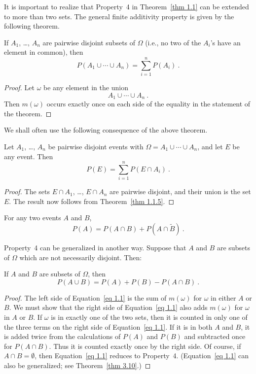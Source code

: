\par
It is important to realize that Property~4 in Theorem~\ref{thm 1.1} 
can be extended to more than two sets.  The general finite additivity
property is given by the following
theorem.\hfil\break
\begin{theorem}\label{thm 1.1.5}
\leanok
If $A_1$, \dots, $A_n$ are pairwise disjoint subsets of $\Omega$
(i.e., no two of the $A_i$'s have an element in common), then
$$
P(A_1 \cup \cdots \cup A_n) = \sum_{i = 1}^n P(A_i)\ .
$$
\end{theorem} 
\begin{proof}
\leanok
	Let $\omega$ be any element in the union
	$$A_1 \cup \cdots \cup A_n\ .$$
	Then $m(\omega)$ occurs exactly once on each side of the equality in the
	statement of the theorem.
\end{proof}
\par
We shall often use the following consequence of the above theorem.
\begin{theorem}\label{thm 1.2}
\leanok
 Let $A_1$, \dots, $A_n$ be pairwise disjoint events with $\Omega = A_1
\cup \cdots \cup A_n$, and let $E$ be any event.  Then
$$
P(E) = \sum_{i = 1}^n P(E \cap A_i)\ .
$$
\end{theorem}
\begin{proof}
\leanok
{}
	The sets $E \cap A_1$, \dots, $E \cap A_n$ are pairwise disjoint, and their 
	union is the set $E$.  The result now follows from Theorem~\ref{thm 1.1.5}.
\end{proof}
\begin{corollary}\label{cor 1.1}
\leanok
{}
For any two events $A$ and $B$,
$$
P(A) = P(A \cap B) + P(A \cap \tilde B)\ .
$$
\end{corollary}
\par
Property~4 can be generalized in another way.  Suppose that $A$ and $B$ are
subsets of $\Omega$ which are not necessarily disjoint.  Then:\hfil\break
\begin{theorem}\label{thm 1.2.5}
If $A$ and $B$ are subsets of $\Omega$, then
\begin{equation}
P(A \cup B) = P(A) + P(B) - P(A \cap B)\ .
\label{eq 1.1}
\end{equation}                                                                     
\end{theorem}
\begin{proof}
The left side of Equation~\ref{eq 1.1} is the sum of $m(\omega)$ for     
$\omega$ in either $A$ or $B$.  We must show that the right side of 
Equation~\ref{eq 1.1} also adds $m(\omega)$ for $\omega$ in $A$ or $B$. 
If $\omega$ is in exactly one of the two sets, then it is counted in only one
of the three terms on the right side of Equation~\ref{eq 1.1}.                
If it is in both $A$ and $B$, it is added twice from the calculations of
$P(A)$ and $P(B)$
and subtracted once for $P(A \cap B)$.  Thus it is counted exactly once by
the right side.  Of course, if $A \cap B = \emptyset$, then Equation~\ref{eq 1.1} 
reduces to Property~4.
(Equation~\ref{eq 1.1} can also be generalized; see Theorem~\ref{thm 3.10}.)  
\end{proof}

